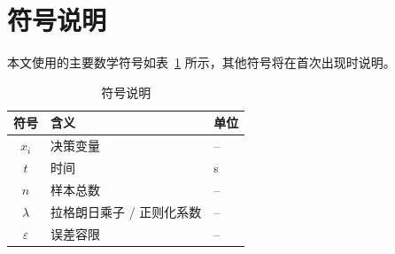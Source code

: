 \section{符号说明}

本文使用的主要数学符号如表~\ref{tab:notation} 所示，其他符号将在首次出现时说明。

\begin{table}[H]
    \centering
    \caption{符号说明}
    \label{tab:notation}
    \begin{tabular}{@{}cll@{}}
        \toprule
        符号 & 含义 & 单位 \\
        \midrule
        $x_i$        & 决策变量                       & --   \\
        $t$          & 时间                           & s    \\
        $n$          & 样本总数                       & --   \\
        $\lambda$    & 拉格朗日乘子 / 正则化系数      & --   \\
        $\varepsilon$ & 误差容限                      & --   \\
        \bottomrule
    \end{tabular}
\end{table}
